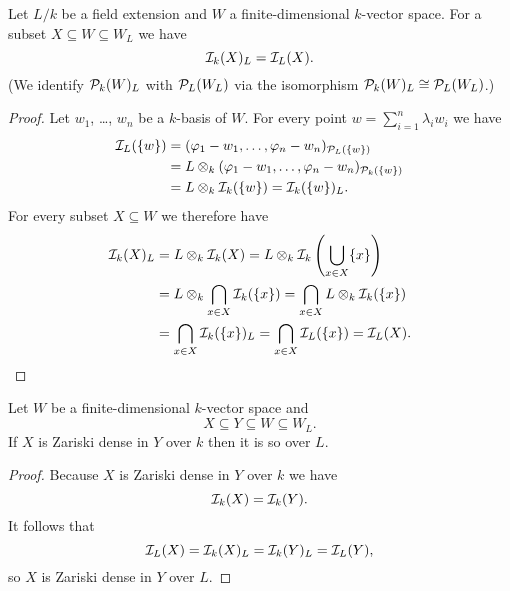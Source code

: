 \begin{lem}
  Let $L/k$ be a field extension and $W$ a finite-dimensional $k$-vector space.
  For a subset $X \subseteq W \subseteq W_L$ we have
  \[
      \mathcal{I}_k(X)_L
    = \mathcal{I}_L(X).
  \]
  (We identify $\mathcal{P}_k(W)_L$ with $\mathcal{P}_L(W_L)$ via the isomorphism $\mathcal{P}_k(W)_L \cong \mathcal{P}_L(W_L)$.)
\end{lem}
\begin{proof}
  Let $w_1$, \dots, $w_n$ be a $k$-basis of $W$.
  For every point $w = \sum_{i=1}^n \lambda_i w_i$ we have
  \begin{align*}
        \mathcal{I}_L(\{w\})
    &=  ( \varphi_1 - w_1, \dotsc, \varphi_n - w_n )_{ \mathcal{P}_L(\{w\}) } \\
    &=  L \otimes_k ( \varphi_1 - w_1, \dotsc, \varphi_n - w_n )_{ \mathcal{P}_k(\{w\}) } \\
    &=  L \otimes_k \mathcal{I}_k(\{w\})
     =  \mathcal{I}_k(\{w\})_L.
  \end{align*}
  For every subset $X \subseteq W$ we therefore have
  \begin{align*}
        \mathcal{I}_k(X)_L
    &=  L \otimes_k \mathcal{I}_k(X)
     =  L \otimes_k \mathcal{I}_k\left( \bigcup_{x \in X} \{x\} \right) \\
    &=  L \otimes_k \bigcap_{x \in X} \mathcal{I}_k(\{x\})
     =  \bigcap_{x \in X} L \otimes_k \mathcal{I}_k(\{x\}) \\
    &=  \bigcap_{x \in X} \mathcal{I}_k(\{x\})_L
     =  \bigcap_{x \in X} \mathcal{I}_L(\{x\})
     =  \mathcal{I}_L(X).
    \qedhere
  \end{align*}
\end{proof}


\begin{cor}\label{cor: Zariski dense scalar extension}
  Let $W$ be a finite-dimensional $k$-vector space and
  \[
              X
    \subseteq Y
    \subseteq W
    \subseteq W_L.
  \]
  If $X$ is Zariski dense in $Y$ over $k$ then it is so over $L$.
\end{cor}
\begin{proof}
  Because $X$ is Zariski dense in $Y$ over $k$ we have
  \[
      \mathcal{I}_k(X)
    = \mathcal{I}_k(Y).
  \]
  It follows that
  \[
      \mathcal{I}_L(X)
    = \mathcal{I}_k(X)_L
    = \mathcal{I}_k(Y)_L
    = \mathcal{I}_L(Y),
  \]
  so $X$ is Zariski dense in $Y$ over $L$.
\end{proof}


